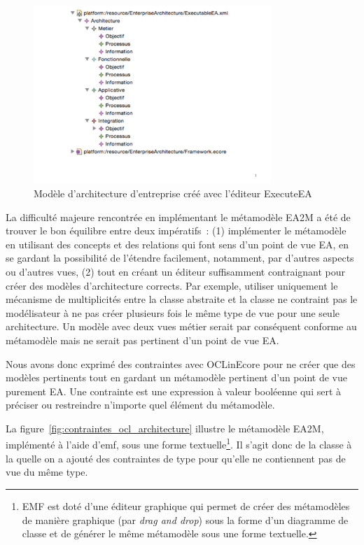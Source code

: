     \begin{figure}[!htbp]
     \begin{center}
      \includegraphics[trim=0cm 3cm 0cm 0cm, width=0.8\textwidth]{figures/5_implementation/modele_ea.pdf}
     \end{center}
     \caption{Modèle d'architecture d'entreprise créé avec l'éditeur ExecuteEA}
     \label{fig:modeleEA}
    \end{figure}

    La difficulté majeure rencontrée en implémentant le métamodèle EA2M a été de
    trouver le bon équilibre entre deux impératifs~: (1) implémenter le
    métamodèle en utilisant des concepts et des relations qui font sens d'un
    point de vue EA, en se gardant la possibilité de l'étendre facilement,
    notamment, par d'autres aspects ou d'autres vues, (2) tout en créant un
    éditeur suffisamment contraignant pour créer des modèles d'architecture
    corrects. Par exemple, utiliser uniquement le mécanisme de multiplicités
    entre la classe abstraite  et la classe  ne contraint
    pas le modélisateur à ne pas créer plusieurs fois le même type de vue pour
    une seule architecture. Un modèle avec deux vues métier serait par
    conséquent conforme au métamodèle mais ne serait pas pertinent d'un point de
    vue EA.

    Nous avons donc exprimé des contraintes avec OCLinEcore pour ne créer que
    des modèles pertinents tout en gardant un métamodèle pertinent d'un point de
    vue purement EA.  Une contrainte est une expression à valeur booléenne qui
    sert à préciser ou restreindre n'importe quel élément du métamodèle.

    La figure~\ref{fig:contraintes_ocl_architecture} illustre le métamodèle
    EA2M, implémenté à l'aide d'\gls{emf}, sous une forme textuelle\footnote{EMF
    est doté d'une éditeur graphique qui permet de créer des métamodèles de
    manière graphique (par \emph{drag and drop}) sous la forme d'un diagramme de
    classe et de générer le même métamodèle sous une forme textuelle.}. Il
    s'agit donc de la classe  à la quelle on a ajouté des
    contraintes de type  pour qu'elle ne contiennent pas de vue du
    même type.

